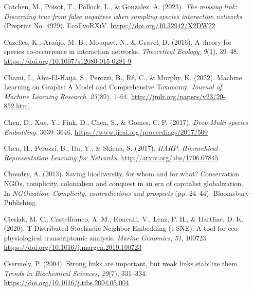 \documentclass[11pt]{article}
\newlength{\cslhangindent}
\newenvironment{CSLReferences}[2] %
 {%
  \setlength{\parindent}{0pt}
  \ifodd #1 \everypar{\setlength{\hangindent}{\cslhangindent}}\ignorespaces\fi
  \ifnum #2 > 0
  \setlength{\parskip}{#2\baselineskip}
  \fi
 }%
 {}
\begin{document}
\begin{CSLReferences}{1}{0}
\leavevmode{}%
Catchen, M., Poisot, T., Pollock, L., \& Gonzalez, A. (2023). \emph{The
missing link: Discerning true from false negatives when sampling species
interaction networks} (Preprint No. 4929). EcoEvoRXiV.
\url{https://doi.org/10.32942/X2DW22}

\leavevmode{}%
Cazelles, K., Araújo, M. B., Mouquet, N., \& Gravel, D. (2016). A theory
for species co-occurrence in interaction networks. \emph{Theoretical
Ecology}, \emph{9}(1), 39--48.
\url{https://doi.org/10.1007/s12080-015-0281-9}

\leavevmode{}%
Chami, I., Abu-El-Haija, S., Perozzi, B., Ré, C., \& Murphy, K. (2022).
Machine Learning on Graphs: A Model and Comprehensive Taxonomy.
\emph{Journal of Machine Learning Research}, \emph{23}(89), 1--64.
\url{http://jmlr.org/papers/v23/20-852.html}

\leavevmode{}%
Chen, D., Xue, Y., Fink, D., Chen, S., \& Gomes, C. P. (2017).
\emph{Deep Multi-species Embedding}. 3639--3646.
\url{https://www.ijcai.org/proceedings/2017/509}

\leavevmode{}%
Chen, H., Perozzi, B., Hu, Y., \& Skiena, S. (2017). \emph{HARP:
Hierarchical Representation Learning for Networks}.
\url{http://arxiv.org/abs/1706.07845}

\leavevmode{}%
Choudry, A. (2013). Saving biodiversity, for whom and for what?
Conservation NGOs, complicity, colonialism and conquest in an era of
capitalist globalization. In \emph{NGOization: Complicity,
contradictions and prospects} (pp. 24--44). Bloomsbury Publishing.

\leavevmode{}%
Cieslak, M. C., Castelfranco, A. M., Roncalli, V., Lenz, P. H., \&
Hartline, D. K. (2020). T-Distributed Stochastic Neighbor Embedding
(t-SNE): A tool for eco-physiological transcriptomic analysis.
\emph{Marine Genomics}, \emph{51}, 100723.
\url{https://doi.org/10.1016/j.margen.2019.100723}

\leavevmode{}%
Csermely, P. (2004). Strong links are important, but weak links
stabilize them. \emph{Trends in Biochemical Sciences}, \emph{29}(7),
331--334. \url{https://doi.org/10.1016/j.tibs.2004.05.004}


\end{CSLReferences}
\end{document}
